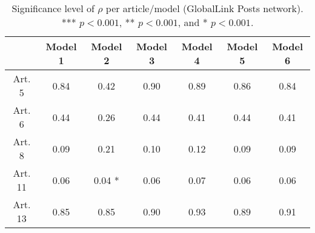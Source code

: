 \begin{table}[ht]
\centering
\begin{tabular}{ccccccc}
  \toprule
 & Model 1 & Model 2 & Model 3 & Model 4 & Model 5 & Model 6 \\ 
  \midrule
Art. 5 & 0.84   & 0.42   & 0.90   & 0.89   & 0.86   & 0.84   \\ 
   \midrule
Art. 6 & 0.44   & 0.26   & 0.44   & 0.41   & 0.44   & 0.41   \\ 
   \midrule
Art. 8 & 0.09   & 0.21   & 0.10   & 0.12   & 0.09   & 0.09   \\ 
   \midrule
Art. 11 & 0.06   & 0.04 * & 0.06   & 0.07   & 0.06   & 0.06   \\ 
   \midrule
Art. 13 & 0.85   & 0.85   & 0.90   & 0.93   & 0.89   & 0.91   \\ 
   \bottomrule
\end{tabular}
\caption{Significance level of $\rho$ per article/model (GlobalLink Posts network). *** $p < 0.001$, ** $p < 0.001$, and * $p < 0.001$.} 
\end{table}
